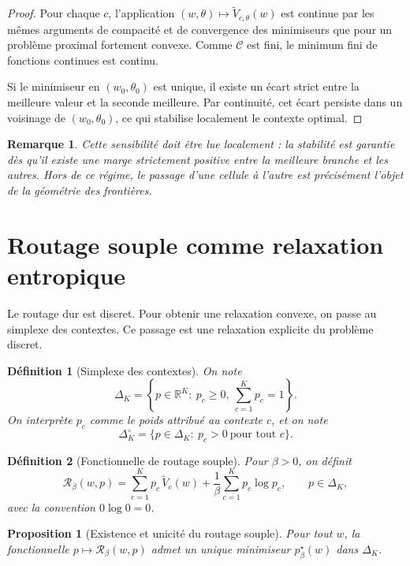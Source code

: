 \documentclass[11pt,a4paper]{article}
\newtheorem{definition}{Définition}[section]
\newtheorem{proposition}{Proposition}[section]
\newtheorem{remark}{Remarque}[section]
\newcommand{\R}{\mathbb R}
\newcommand{\Ccal}{\mathcal C}
\newcommand{\Rcal}{\mathcal R}
\begin{document}
\begin{proof}
Pour chaque \(c\), l'application \((w,\theta)\mapsto \widetilde V_{c,\theta}(w)\) est continue par les mêmes arguments de compacité et de convergence des minimiseurs que pour un problème proximal fortement convexe. Comme \(\Ccal\) est fini, le minimum fini de fonctions continues est continu.

Si le minimiseur en \((w_0,\theta_0)\) est unique, il existe un écart strict entre la meilleure valeur et la seconde meilleure. Par continuité, cet écart persiste dans un voisinage de \((w_0,\theta_0)\), ce qui stabilise localement le contexte optimal.
\end{proof}

\begin{remark}
Cette sensibilité doit être lue localement : la stabilité est garantie dès qu'il existe une marge strictement positive entre la meilleure branche et les autres. Hors de ce régime, le passage d'une cellule à l'autre est précisément l'objet de la géométrie des frontières.
\end{remark}

\section{Routage souple comme relaxation entropique}

Le routage dur est discret. Pour obtenir une relaxation convexe, on passe au simplexe des contextes. Ce passage est une relaxation explicite du problème discret.

\begin{definition}[Simplexe des contextes]
On note
\[
\Delta_K
=
\left\{
 p\in\R^K:\ p_c\ge 0,\ \sum_{c=1}^K p_c=1
\right\}.
\]
On interprète \(p_c\) comme le poids attribué au contexte \(c\), et on note
\[
\Delta_K^\circ=
\{p\in\Delta_K:\ p_c>0\ \text{pour tout }c\}.
\]
\end{definition}

\begin{definition}[Fonctionnelle de routage souple]
Pour \(\beta>0\), on définit
\[
\Rcal_\beta(w,p)
=
\sum_{c=1}^K p_c\,\widetilde V_c(w)
+
\frac{1}{\beta}\sum_{c=1}^K p_c\log p_c,
\qquad p\in\Delta_K,
\]
avec la convention \(0\log 0=0\).
\end{definition}

\begin{proposition}[Existence et unicité du routage souple]
Pour tout \(w\), la fonctionnelle \(p\mapsto \Rcal_\beta(w,p)\) admet un unique minimiseur \(p^\star_\beta(w)\) dans \(\Delta_K\).
\end{proposition}
\end{document}
